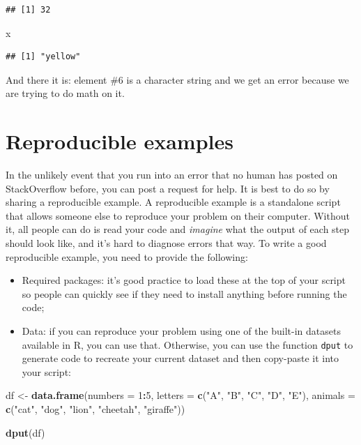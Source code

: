 \documentclass[
]{book}
\newenvironment{Shaded}{\begin{snugshade}}{\end{snugshade}}
\newcommand{\AttributeTok}[1]{\textcolor[rgb]{0.13,0.29,0.53}{#1}}
\newcommand{\DecValTok}[1]{\textcolor[rgb]{0.00,0.00,0.81}{#1}}
\newcommand{\FunctionTok}[1]{\textcolor[rgb]{0.13,0.29,0.53}{\textbf{#1}}}
\newcommand{\NormalTok}[1]{#1}
\newcommand{\OtherTok}[1]{\textcolor[rgb]{0.56,0.35,0.01}{#1}}
\newcommand{\SpecialCharTok}[1]{\textcolor[rgb]{0.81,0.36,0.00}{\textbf{#1}}}
\newcommand{\StringTok}[1]{\textcolor[rgb]{0.31,0.60,0.02}{#1}}
\providecommand{\tightlist}{%
  \setlength{\itemsep}{0pt}\setlength{\parskip}{0pt}}
\begin{document}
\begin{verbatim}
## [1] 32
\end{verbatim}

\begin{Shaded}
\begin{Highlighting}[]
\NormalTok{x}
\end{Highlighting}
\end{Shaded}

\begin{verbatim}
## [1] "yellow"
\end{verbatim}

And there it is: element \#6 is a character string and we get an error because
we are trying to do math on it.

\hypertarget{reproducible-examples}{%
\section{Reproducible examples}\label{reproducible-examples}}

In the unlikely event that you run into an error that no human has posted on
StackOverflow before, you can post a request for help. It is best to do so by
sharing a reproducible example. A reproducible example is a standalone script
that allows someone else to reproduce your problem on their computer. Without
it, all people can do is read your code and \emph{imagine} what the output of each
step should look like, and it's hard to diagnose errors that way. To write a
good reproducible example, you need to provide the following:

\begin{itemize}
\tightlist
\item
  Required packages: it's good practice to load these at the top of your script
  so people can quickly see if they need to install anything before running the
  code;
\item
  Data: if you can reproduce your problem using one of the built-in datasets
  available in R, you can use that. Otherwise, you can use the function \texttt{dput} to
  generate code to recreate your current dataset and then copy-paste it into your
  script:
\end{itemize}

\begin{Shaded}
\begin{Highlighting}[]
\NormalTok{df }\OtherTok{\textless{}{-}} \FunctionTok{data.frame}\NormalTok{(}\AttributeTok{numbers =} \DecValTok{1}\SpecialCharTok{:}\DecValTok{5}\NormalTok{,}
                 \AttributeTok{letters =} \FunctionTok{c}\NormalTok{(}\StringTok{"A"}\NormalTok{, }\StringTok{"B"}\NormalTok{, }\StringTok{"C"}\NormalTok{, }\StringTok{"D"}\NormalTok{, }\StringTok{"E"}\NormalTok{),}
                 \AttributeTok{animals =} \FunctionTok{c}\NormalTok{(}\StringTok{"cat"}\NormalTok{, }\StringTok{"dog"}\NormalTok{, }\StringTok{"lion"}\NormalTok{, }\StringTok{"cheetah"}\NormalTok{, }\StringTok{"giraffe"}\NormalTok{))}

\FunctionTok{dput}\NormalTok{(df)}
\end{Highlighting}
\end{Shaded}
\end{document}
